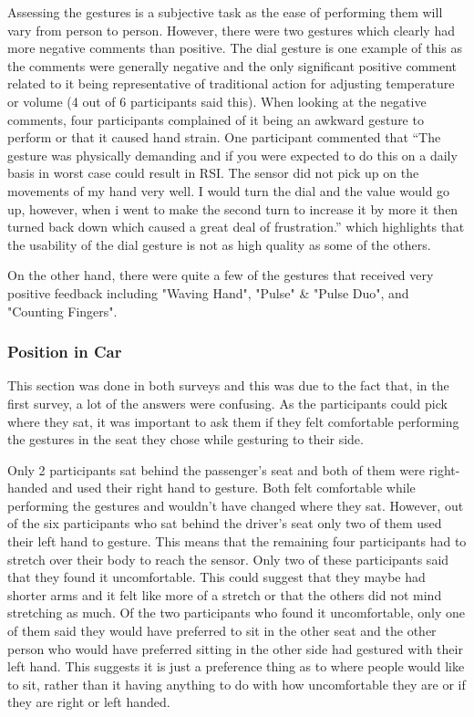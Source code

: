 \documentclass{l4proj}
\begin{document}
Assessing the gestures is a subjective task as the ease of performing them will vary from person to person. However, there were two gestures which clearly had more negative comments than positive. The dial gesture is one example of this as the comments were generally negative and the only significant positive comment related to it being representative of traditional action for adjusting temperature or volume (4 out of 6 participants said this). When looking at the negative comments, four participants complained of it being an awkward gesture to perform or that it caused hand strain. One participant commented that “The gesture was physically demanding and if you were expected to do this on a daily basis in worst case could result in RSI. The sensor did not pick up on the movements of my hand very well. I would turn the dial and the value would go up, however, when i went to make the second turn to increase it by more it then turned back down which caused a great deal of frustration.” which highlights that the usability of the dial gesture is not as high quality as some of the others.

On the other hand, there were quite a few of the gestures that received very positive feedback including "Waving Hand", "Pulse" \& "Pulse Duo", and "Counting Fingers".

\subsubsection{Position in Car}
This section was done in both surveys and this was due to the fact that, in the first survey, a lot of the answers were confusing. As the participants could pick where they sat, it was important to ask them if they felt comfortable performing the gestures in the seat they chose while gesturing to their side. 

Only 2 participants sat behind the passenger’s seat and both of them were right-handed and used their right hand to gesture. Both felt comfortable while performing the gestures and wouldn’t have changed where they sat.
However, out of the six participants who sat behind the driver’s seat only two of them used their left hand to gesture. This means that the remaining four participants had to stretch over their body to reach the sensor. Only two of these participants said that they found it uncomfortable. This could suggest that they maybe had shorter arms and it felt like more of a stretch or that the others did not mind stretching as much. Of the two participants who found it uncomfortable, only one of them said they would have preferred to sit in the other seat and the other person who would have preferred sitting in the other side had gestured with their left hand. This suggests it is just a preference thing as to where people would like to sit, rather than it having anything to do with how uncomfortable they are or if they are right or left handed. 
\end{document}
